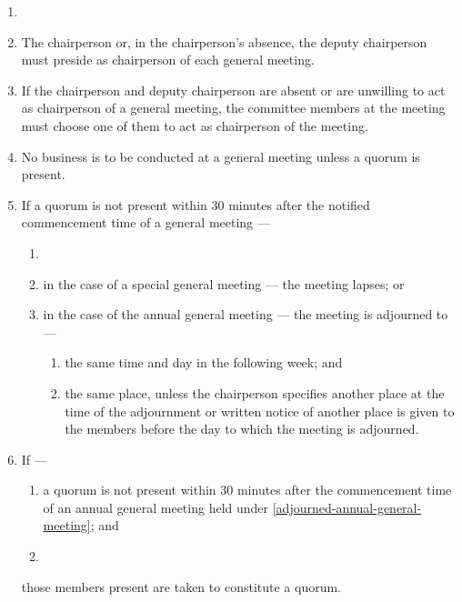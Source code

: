 \documentclass[../constitution.tex]{subfiles}
\begin{document}
\begin{enumerate}

\item {} 
\item The chairperson or, in the chairperson's absence, the deputy chairperson must preside as chairperson of each general meeting.
\item If the chairperson and deputy chairperson are absent or are unwilling to act as chairperson of a general meeting, the committee members at the meeting must choose one of them to act as chairperson of the meeting.
\item No business is to be conducted at a general meeting unless a quorum is present.
\item If a quorum is not present within 30 minutes after the notified commencement time of a general meeting ---

  \begin{enumerate}
  
  \item {}
  \item in the case of a special general meeting --- the meeting lapses; or
  \item in the case of the annual general meeting --- the meeting is adjourned to --- \label{adjourned-annual-general-meeting}

    \begin{enumerate}
    
    \item the same time and day in the following week; and
    \item the same place, unless the chairperson specifies another place at the time of the adjournment or written notice of another place is given to the members before the day to which the meeting is adjourned.
    \end{enumerate}
  \end{enumerate}
\item If ---

  \begin{enumerate}
  
  \item a quorum is not present within 30 minutes after the commencement time of an annual general meeting held under  \ref{adjourned-annual-general-meeting}; and
  \item {}
  \end{enumerate}
  those members present are taken to constitute a quorum.
\end{enumerate}
\end{document}
